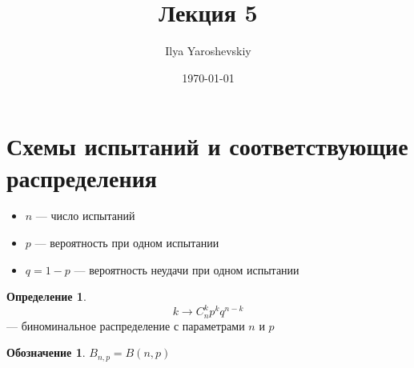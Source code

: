 \documentclass[english]{article}
\author{Ilya Yaroshevskiy}
\date{\today}
\title{Лекция 5}
\theoremstyle{plain}
\theoremstyle{remark}
\theoremstyle{definition}
\newtheorem*{definition}{Определение}
\newtheorem*{symb}{Обозначение}
\begin{document}
\maketitle
\tableofcontents


\section{Схемы испытаний и соответствующие распределения}
\label{sec:org04f0b8e}
\begin{itemize}
\item \(n\) --- число испытаний
\item \(p\) --- вероятность при одном испытании
\item \(q = 1 - p\) --- вероятность неудачи при одном испытании
\end{itemize}


\begin{definition}
\[ k \to C^k_n p^k q^{n - k} \] --- биноминальное распределение с параметрами \(n\) и \(p\)
\end{definition}
\begin{symb}
\(B_{n,p} = B(n, p)\)
\end{symb}
\end{document}
